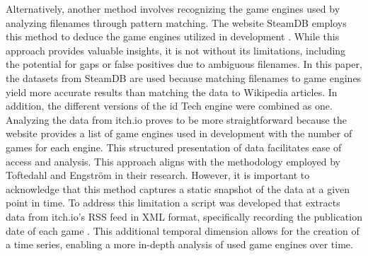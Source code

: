 Alternatively, another method involves recognizing the game engines used by analyzing filenames through pattern matching.
The website SteamDB employs this method to deduce the game engines utilized in development \cite{steamdb-tech}.
While this approach provides valuable insights, it is not without its limitations, including the potential for gaps or false positives due to ambiguous filenames.
In this paper, the datasets from SteamDB are used because matching filenames to game engines yield more accurate results than matching the data to Wikipedia articles.
In addition, the different versions of the id Tech engine were combined as one. \\

Analyzing the data from itch.io proves to be more straightforward because the website provides a list of game engines used in development with the number of games for each engine.
This structured presentation of data facilitates ease of access and analysis.
This approach aligns with the methodology employed by Toftedahl and Engström in their research.
However, it is important to acknowledge that this method captures a static snapshot of the data at a given point in time.
To address this limitation a script was developed that extracts data from itch.io's RSS feed in XML format, specifically recording the publication date of each game \cite{github-trend-itch}.
This additional temporal dimension allows for the creation of a time series, enabling a more in-depth analysis of used game engines over time.
